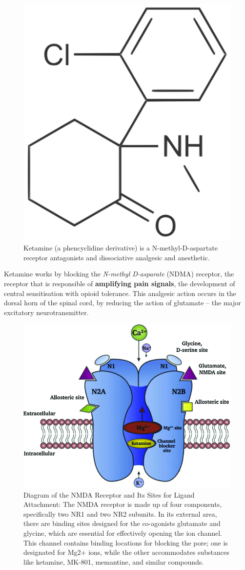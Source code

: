 \documentclass[
]{book}
\begin{document}
\begin{figure}
\includegraphics[width=0.7\linewidth]{ket_molecule} \caption{Ketamine (a phencyclidine derivative) is a N-methyl-D-aspartate receptor antagonists and dissociative analgesic and anesthetic.}\label{fig:unnamed-chunk-1}
\end{figure}

Ketamine works by blocking the \emph{N-methyl D-asparate} (NDMA) receptor, the receptor that is responsible of \textbf{amplifying pain signals}, the development of central sensitisation with opioid tolerance. This analgesic action occurs in the dorsal horn of the spinal cord, by reducing the action of glutamate -- the major excitatory neurotransmitter.\citep{magPain}

\begin{figure}
\includegraphics[width=0.7\linewidth]{NMDA} \caption{Diagram of the NMDA Receptor and Its Sites for Ligand Attachment: The NMDA receptor is made up of four components, specifically two NR1 and two NR2 subunits. In its external area, there are binding sites designed for the co-agonists glutamate and glycine, which are essential for effectively opening the ion channel. This channel contains binding locations for blocking the pore; one is designated for Mg2+ ions, while the other accommodates substances like ketamine, MK-801, memantine, and similar compounds.}\label{fig:unnamed-chunk-2}
\end{figure}
\end{document}
